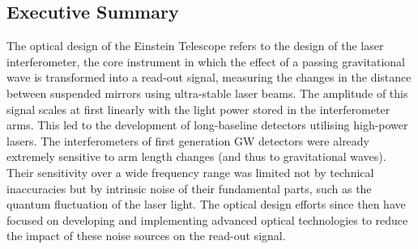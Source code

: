 \FloatBarrier
\subsection{Executive Summary}

The optical design of the Einstein Telescope refers to the design of
the laser interferometer, the core instrument in which the
effect of a passing gravitational wave is
transformed into a read-out signal, measuring the changes 
in the distance between suspended mirrors using ultra-stable
laser beams. The amplitude of this signal
scales at first linearly with the light power stored in the  
interferometer arms. This led to the development of long-baseline
detectors utilising high-power lasers. The interferometers of 
first generation GW detectors were already extremely sensitive 
to arm length changes (and thus to gravitational waves). Their sensitivity
over a wide frequency range was limited not by technical inaccuracies 
but by intrinsic noise of their fundamental parts, such as the quantum
fluctuation of the laser light. The optical design efforts since then
have focused on developing and implementing advanced
optical technologies to reduce the impact of these noise sources 
on the read-out signal.

